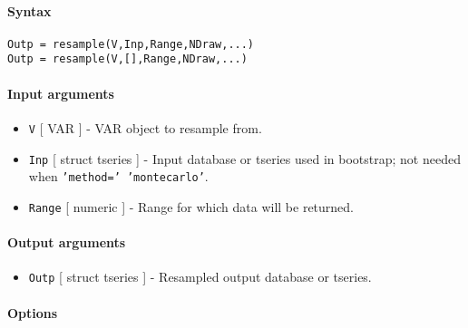 


	\paragraph{Syntax}\label{syntax}

\begin{verbatim}
Outp = resample(V,Inp,Range,NDraw,...)
Outp = resample(V,[],Range,NDraw,...)
\end{verbatim}

\paragraph{Input arguments}\label{input-arguments}

\begin{itemize}
\item
  \texttt{V} {[} VAR {]} - VAR object to resample from.
\item
  \texttt{Inp} {[} struct \textbar{} tseries {]} - Input database or
  tseries used in bootstrap; not needed when
  \texttt{'method=' 'montecarlo'}.
\item
  \texttt{Range} {[} numeric {]} - Range for which data will be
  returned.
\end{itemize}

\paragraph{Output arguments}\label{output-arguments}

\begin{itemize}
\itemsep1pt\parskip0pt
\item
  \texttt{Outp} {[} struct \textbar{} tseries {]} - Resampled output
  database or tseries.
\end{itemize}

\paragraph{Options}\label{options}

